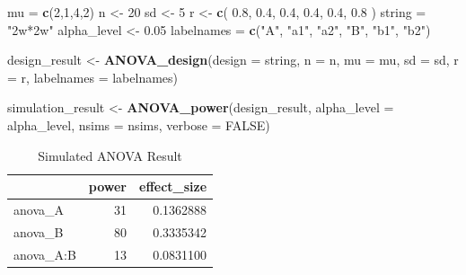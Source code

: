 \documentclass[]{book}
\newenvironment{Shaded}{\begin{snugshade}}{\end{snugshade}}
\newcommand{\DataTypeTok}[1]{\textcolor[rgb]{0.13,0.29,0.53}{#1}}
\newcommand{\DecValTok}[1]{\textcolor[rgb]{0.00,0.00,0.81}{#1}}
\newcommand{\FloatTok}[1]{\textcolor[rgb]{0.00,0.00,0.81}{#1}}
\newcommand{\KeywordTok}[1]{\textcolor[rgb]{0.13,0.29,0.53}{\textbf{#1}}}
\newcommand{\NormalTok}[1]{#1}
\newcommand{\OtherTok}[1]{\textcolor[rgb]{0.56,0.35,0.01}{#1}}
\newcommand{\StringTok}[1]{\textcolor[rgb]{0.31,0.60,0.02}{#1}}
\begin{document}
\begin{Shaded}
\begin{Highlighting}[]
\NormalTok{mu =}\StringTok{ }\KeywordTok{c}\NormalTok{(}\DecValTok{2}\NormalTok{,}\DecValTok{1}\NormalTok{,}\DecValTok{4}\NormalTok{,}\DecValTok{2}\NormalTok{) }
\NormalTok{n <-}\StringTok{ }\DecValTok{20}
\NormalTok{sd <-}\StringTok{ }\DecValTok{5}
\NormalTok{r <-}\StringTok{ }\KeywordTok{c}\NormalTok{(}
  \FloatTok{0.8}\NormalTok{, }\FloatTok{0.4}\NormalTok{, }\FloatTok{0.4}\NormalTok{,}
       \FloatTok{0.4}\NormalTok{, }\FloatTok{0.4}\NormalTok{,}
            \FloatTok{0.8}
\NormalTok{  )}
\NormalTok{string =}\StringTok{ "2w*2w"}
\NormalTok{alpha_level <-}\StringTok{ }\FloatTok{0.05}
\NormalTok{labelnames =}\StringTok{ }\KeywordTok{c}\NormalTok{(}\StringTok{"A"}\NormalTok{, }\StringTok{"a1"}\NormalTok{, }\StringTok{"a2"}\NormalTok{, }\StringTok{"B"}\NormalTok{, }\StringTok{"b1"}\NormalTok{, }\StringTok{"b2"}\NormalTok{)}

\NormalTok{design_result <-}\StringTok{ }\KeywordTok{ANOVA_design}\NormalTok{(}\DataTypeTok{design =}\NormalTok{ string,}
                              \DataTypeTok{n =}\NormalTok{ n, }
                              \DataTypeTok{mu =}\NormalTok{ mu, }
                              \DataTypeTok{sd =}\NormalTok{ sd, }
                              \DataTypeTok{r =}\NormalTok{ r, }
                              \DataTypeTok{labelnames =}\NormalTok{ labelnames)}

\NormalTok{simulation_result <-}\StringTok{ }\KeywordTok{ANOVA_power}\NormalTok{(design_result, }
                                 \DataTypeTok{alpha_level =}\NormalTok{ alpha_level, }
                                 \DataTypeTok{nsims =}\NormalTok{ nsims,}
                                 \DataTypeTok{verbose =} \OtherTok{FALSE}\NormalTok{)}
\end{Highlighting}
\end{Shaded}

\begin{table}[t]

\caption{\label{tab:unnamed-chunk-124}Simulated ANOVA Result}
\centering
\begin{tabular}{l|r|r}
\hline
  & power & effect\_size\\
\hline
anova\_A & 31 & 0.1362888\\
\hline
anova\_B & 80 & 0.3335342\\
\hline
anova\_A:B & 13 & 0.0831100\\
\hline
\end{tabular}
\end{table}
\end{document}
